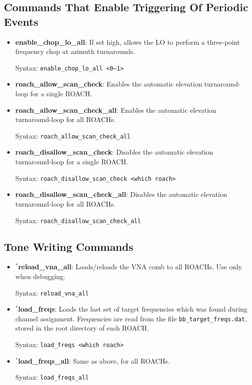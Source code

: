 \subsection{Commands That Enable Triggering Of Periodic Events}

\begin{itemize}[leftmargin=*,label={}]

\item \textbf{enable\_chop\_lo\_all}: If set high, allows the LO to perform a three-point frequency chop at azimuth turnarounds.

Syntax: \texttt{enable\_chop\_lo\_all <0--1>}

\item \textbf{roach\_allow\_scan\_check}: Enables the automatic elevation turnaround-loop for a single ROACH\@.

\item \textbf{roach\_allow\_scan\_check\_all}: Enables the automatic elevation turnaround-loop for all ROACHs.

Syntax: \texttt{roach\_allow\_scan\_check\_all}

\item \textbf{roach\_disallow\_scan\_check}: Disables the automatic elevation turnaround-loop for a single ROACH\@.

Syntax: \texttt{roach\_disallow\_scan\_check <which roach>}

\item \textbf{roach\_disallow\_scan\_check\_all}: Disables the automatic elevation turnaround-loop for all ROACHs.

Syntax: \texttt{roach\_disallow\_scan\_check\_all}

\end{itemize}

\subsection{Tone Writing Commands}
\begin{itemize}[leftmargin=*,label={}]

\item $^{*}$\textbf{reload\_vna\_all}: Loads/reloads the VNA comb to all ROACHs. Use only when debugging.

Syntax: \texttt{reload\_vna\_all}

\item $^{*}$\textbf{load\_freqs}: Loads the last set of target frequencies which was found during channel assignment. Frequencies are read from the file \texttt{bb\_target\_freqs.dat}, stored in the root directory of each ROACH\@.

Syntax: \texttt{load\_freqs <which roach>}

\item $^{*}$\textbf{load\_freqs\_all}: Same as above, for all ROACHs.

Syntax: \texttt{load\_freqs\_all}

\end{itemize}


